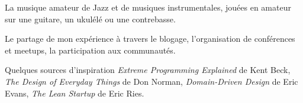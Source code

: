 

\begin{cvinterests}

    \cvinterest
      {La musique}
      {amateur de Jazz et de musiques instrumentales, jouées en amateur sur une guitare, un ukulélé ou une contrebasse.}

    \cvinterest
      {Le partage de mon expérience}
      {à travers le blogage, l'organisation de conférences et meetups, la participation aux communautés.}

    \cvinterest
      {Quelques sources d'inspiration}
      {\textit{Extreme Programming Explained} de Kent Beck, \textit{The Design of Everyday Things} de Don Norman, \textit{Domain-Driven Design} de Eric Evans, \textit{The Lean Startup} de Eric Ries.}

\end{cvinterests}
